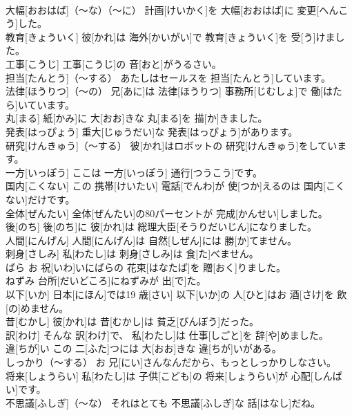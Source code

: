 \documentclass[8pt]{extreport}
\begin{document}
\begin{CJK}{UTF8}{min}
\\	大幅[おおはば]（～な）（～に）	計画[けいかく]を 大幅[おおはば]に 変更[へんこう]した。		
\\	教育[きょういく]	彼[かれ]は 海外[かいがい]で 教育[きょういく]を 受[う]けました。		
\\	工事[こうじ]	工事[こうじ]の 音[おと]がうるさい。		
\\	担当[たんとう]（～する）	あたしはセールスを 担当[たんとう]しています。		
\\	法律[ほうりつ]（～の）	兄[あに]は 法律[ほうりつ] 事務所[じむしょ]で 働[はたら]いています。		
\\	丸[まる]	紙[かみ]に 大[おお]きな 丸[まる]を 描[か]きました。		
\\	発表[はっぴょう]	重大[じゅうだい]な 発表[はっぴょう]があります。		
\\	研究[けんきゅう]（～する）	彼[かれ]はロボットの 研究[けんきゅう]をしています。		
\\	一方[いっぽう]	ここは 一方[いっぽう] 通行[つうこう]です。		
\\	国内[こくない]	この 携帯[けいたい] 電話[でんわ]が 使[つか]えるのは 国内[こくない]だけです。		
\\	全体[ぜんたい]	全体[ぜんたい]の80パーセントが 完成[かんせい]しました。		
\\	後[のち]	後[のち]に 彼[かれ]は 総理大臣[そうりだいじん]になりました。		
\\	人間[にんげん]	人間[にんげん]は 自然[しぜん]には 勝[か]てません。		
\\	刺身[さしみ]	私[わたし]は 刺身[さしみ]は 食[た]べません。		
\\	ばら	お 祝[いわ]いにばらの 花束[はなたば]を 贈[おく]りました。		
\\	ねずみ	台所[だいどころ]にねずみが 出[で]た。		
\\	以下[いか]	日本[にほん]では19 歳[さい] 以下[いか]の 人[ひと]はお 酒[さけ]を 飲[の]めません。		
\\	昔[むかし]	彼[かれ]は 昔[むかし]は 貧乏[びんぼう]だった。		
\\	訳[わけ]	そんな 訳[わけ]で、 私[わたし]は 仕事[しごと]を 辞[や]めました。		
\\	違[ちが]い	この 二[ふた]つには 大[おお]きな 違[ちが]いがある。		
\\	しっかり（～する）	お 兄[にい]さんなんだから、もっとしっかりしなさい。		
\\	将来[しょうらい]	私[わたし]は 子供[こども]の 将来[しょうらい]が 心配[しんぱい]です。		
\\	不思議[ふしぎ]（～な）	それはとても 不思議[ふしぎ]な 話[はなし]だね。		

\end{CJK}
\end{document}
